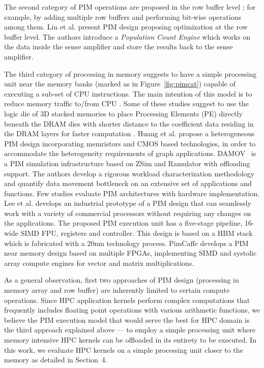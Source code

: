 The second category of PIM operations are proposed in the row buffer level ; for example, by adding multiple row buffers and performing bit-wise operations among them. Lin et al. \cite{31} present PIM design proposing optimization at the row buffer level. The authors introduce a \textit{Population Count Engine} which works on the data inside the sense amplifier and store the results back to the sense amplifier.

The third category of processing in memory suggests to have a simple processing unit near the memory banks (marked as  in Figure~\ref{fig:pimcat}) capable of executing a sub-set of CPU instructions. The main intention of this model is to reduce memory traffic to/from CPU \cite{01,02,05,11,12,17,30,32,33,34,35,71}. Some of these studies suggest to use the logic die of 3D stacked memories to place Processing Elements (PE) directly beneath the DRAM dies with shorter distance to the coefficient data residing in the DRAM layers for faster computation \cite{09,12,30,32}.  Huang et al. \cite{33} propose a heterogeneous PIM design incorporating memristors and CMOS based technologies, in order to accommodate the heterogeneity requirements of graph applications. DAMOV~\cite{71} is a PIM simulation infrastructure based on ZSim\fixme{[]} and Ramulator \fixme{[]} with offloading support. The authors develop a rigorous workload characterization methodology and quantify data movement bottleneck on an extensive set of applications and functions. Few studies evaluate PIM architectures with hardware implementation. Lee et al. \cite{12} develops an industrial prototype of a PIM design that can seamlessly work with a variety of commercial processors without requiring any changes on the applications. The proposed PIM execution unit has a five-stage pipeline, 16-wide SIMD FPU, registers and controller. This design is based on a HBM stack which is fabricated with a 20nm technology process. PimCaffe \cite{16} develops a PIM near memory design based on multiple FPGAs, implementing SIMD and systolic array compute engines for vector and matrix multiplications.    

As a general observation, first two approaches of PIM design (processing in memory array and row buffer) are inherently limited to certain compute operations. Since HPC application kernels perform complex computations that frequently includes floating point operations with various arithmetic functions, we believe the PIM execution model that would serve the best for HPC domain is the third approach explained above --- to employ a simple processing unit where memory intensive HPC kernels can be offloaded in its entirety to be executed. In this work, we evaluate HPC kernels on a simple processing unit closer to the memory as detailed in Section~4. 

